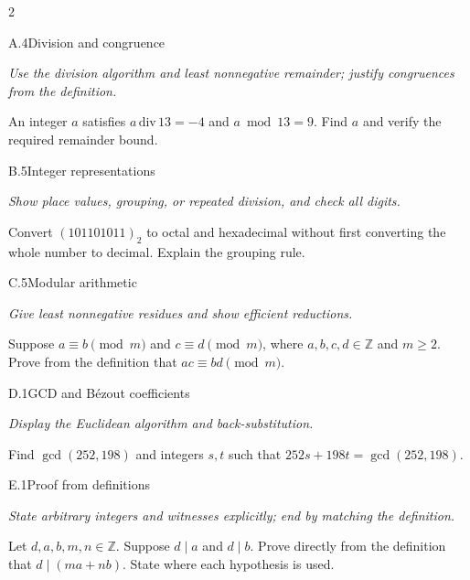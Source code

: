 \documentclass[9pt]{extarticle}
\begin{document}
\begin{multicols}{2}
\begin{CoreProblem}{A.4}{Division and congruence}
{\scriptsize\textit{Use the division algorithm and least nonnegative remainder; justify congruences from the definition.}\par}
An integer $a$ satisfies $a\,\mathrm{div}\,13=-4$ and $a\bmod13=9$.
Find $a$ and verify the required remainder bound.
\end{CoreProblem}
\begin{CoreProblem}{B.5}{Integer representations}
{\scriptsize\textit{Show place values, grouping, or repeated division, and check all digits.}\par}
Convert $(101101011)_2$ to octal and hexadecimal without first converting the
whole number to decimal. Explain the grouping rule.
\end{CoreProblem}
\begin{CoreProblem}{C.5}{Modular arithmetic}
{\scriptsize\textit{Give least nonnegative residues and show efficient reductions.}\par}
Suppose $a\equiv b\pmod m$ and $c\equiv d\pmod m$, where
$a,b,c,d\in\mathbb Z$ and $m\ge2$. Prove from the definition that
$ac\equiv bd\pmod m$.
\end{CoreProblem}
\columnbreak
\begin{CoreProblem}{D.1}{GCD and B\'ezout coefficients}
{\scriptsize\textit{Display the Euclidean algorithm and back-substitution.}\par}
Find $\gcd(252,198)$ and integers $s,t$ such that
$252s+198t=\gcd(252,198)$.
\end{CoreProblem}
\begin{CoreProblem}{E.1}{Proof from definitions}
{\scriptsize\textit{State arbitrary integers and witnesses explicitly; end by matching the definition.}\par}
Let $d,a,b,m,n\in\mathbb Z$. Suppose $d\mid a$ and $d\mid b$. Prove directly
from the definition that $d\mid(ma+nb)$. State where each hypothesis is used.
\end{CoreProblem}
\end{multicols}
\CoreWorkArea
\FormBreak
{}
\end{document}
